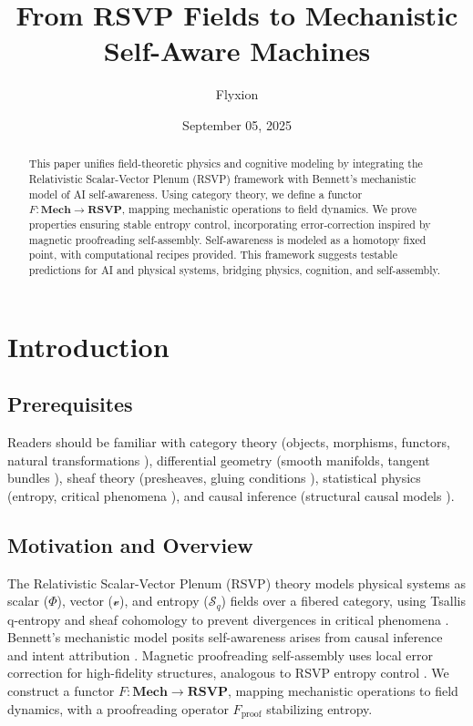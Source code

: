 \documentclass{article}
\title{From RSVP Fields to Mechanistic Self-Aware Machines}
\author{Flyxion}
\date{September 05, 2025}
\theoremstyle{plain}
\theoremstyle{definition}
\begin{document}
\maketitle

\begin{abstract}
This paper unifies field-theoretic physics and cognitive modeling by integrating the Relativistic Scalar-Vector Plenum (RSVP) framework with Bennett’s mechanistic model of AI self-awareness. Using category theory, we define a functor $F: \mathbf{Mech} \to \mathbf{RSVP}$, mapping mechanistic operations to field dynamics. We prove properties ensuring stable entropy control, incorporating error-correction inspired by magnetic proofreading self-assembly. Self-awareness is modeled as a homotopy fixed point, with computational recipes provided. This framework suggests testable predictions for AI and physical systems, bridging physics, cognition, and self-assembly.
\end{abstract}

\section{Introduction}

\subsection{Prerequisites}
Readers should be familiar with category theory (objects, morphisms, functors, natural transformations \cite{Awodey2010,Lawvere2009}), differential geometry (smooth manifolds, tangent bundles \cite{Kock2004}), sheaf theory (presheaves, gluing conditions \cite{MacLane1992,Bredon1997}), statistical physics (entropy, critical phenomena \cite{Tsallis1988}), and causal inference (structural causal models \cite{Pearl2009}).

\subsection{Motivation and Overview}
The Relativistic Scalar-Vector Plenum (RSVP) theory models physical systems as scalar ($\Phi$), vector ($\mathcal{v}$), and entropy ($\mathcal{S}_q$) fields over a fibered category, using Tsallis q-entropy and sheaf cohomology to prevent divergences in critical phenomena \cite{Soares2024,Tsallis1988,Soares2023prb,Soares2023physica}. Bennett’s mechanistic model posits self-awareness arises from causal inference and intent attribution \cite{Bennett2025}. Magnetic proofreading self-assembly uses local error correction for high-fidelity structures, analogous to RSVP entropy control \cite{Liang2025}. We construct a functor $F: \mathbf{Mech} \to \mathbf{RSVP}$, mapping mechanistic operations to field dynamics, with a proofreading operator $F_\text{proof}$ stabilizing entropy.
\end{document}
